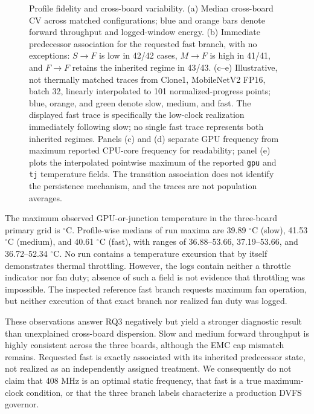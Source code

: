 \documentclass[electronics,article,submit,pdftex,moreauthors]{Definitions/mdpi}
\newcommand{\mobile}{MobileNetV2}
\begin{document}
\begin{figure}[p]
\centering

\caption{Profile fidelity and cross-board variability. (a) Median cross-board CV across matched configurations; blue and orange bars denote forward throughput and logged-window energy. (b) Immediate predecessor association for the requested fast branch, with no exceptions: $S\!\rightarrow\!F$ is low in 42/42 cases, $M\!\rightarrow\!F$ is high in 41/41, and $F\!\rightarrow\!F$ retains the inherited regime in 43/43. (c--e) Illustrative, not thermally matched traces from Clone1, \mobile{} FP16, batch 32, linearly interpolated to 101 normalized-progress points; blue, orange, and green denote slow, medium, and fast. The displayed fast trace is specifically the low-clock realization immediately following slow; no single fast trace represents both inherited regimes. Panels (c) and (d) separate GPU frequency from maximum reported CPU-core frequency for readability; panel (e) plots the interpolated pointwise maximum of the reported \texttt{gpu} and \texttt{tj} temperature fields. The transition association does not identify the persistence mechanism, and the traces are not population averages.}
\label{fig:profile-fidelity}
\end{figure}

The maximum observed GPU-or-junction temperature in the three-board primary grid is \MaximumObservedTemperature{} $^\circ$C. Profile-wise medians of run maxima are 39.89 $^\circ$C (slow), 41.53 $^\circ$C (medium), and 40.61 $^\circ$C (fast), with ranges of 36.88--53.66, 37.19--53.66, and 36.72--52.34 $^\circ$C. No run contains a temperature excursion that by itself demonstrates thermal throttling. However, the logs contain neither a throttle indicator nor fan duty; absence of such a field is not evidence that throttling was impossible. The inspected reference fast branch requests maximum fan operation, but neither execution of that exact branch nor realized fan duty was logged.

These observations answer RQ3 negatively but yield a stronger diagnostic result than unexplained cross-board dispersion. Slow and medium forward throughput is highly consistent across the three boards, although the EMC cap mismatch remains. Requested fast is exactly associated with its inherited predecessor state, not realized as an independently assigned treatment. We consequently do not claim that 408 MHz is an optimal static frequency, that fast is a true maximum-clock condition, or that the three branch labels characterize a production DVFS governor.
\end{document}
